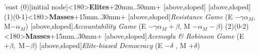 \begin{istgame}[font=\footnotesize]
	\centering
	\setistgrowdirection'{east}
	\xtShowArrows
	\istroot(0)[initial node]<180>{\textbf{Elites}}+20mm..50mm+
	[above,sloped]  [above,sloped] \endist
	\istroot(1)(0-1)<180>{\textbf{Masses}}+15mm..30mm+
	[above,sloped]{\textit{Resistance Game} (E $- \gamma\alpha_{M}$, M$-\alpha_{M}$) }
	[above,sloped]{\textit{Accountability Game} (E $- \gamma\alpha_{M} + \beta$, M $- \alpha_{M} - \beta$)}  \endist
	\istroot(2)(0-2)<180>{\textbf{Masses}}+15mm..30mm+
	[above,sloped]{\textit{Acemoglu \& Robinson Game} (E $+ \beta,\; $M$-\beta$)}
	[above,sloped]{\textit{Elite-biased Democracy} (E $-\delta$ , M $+ \delta$)} \endist
\end{istgame}